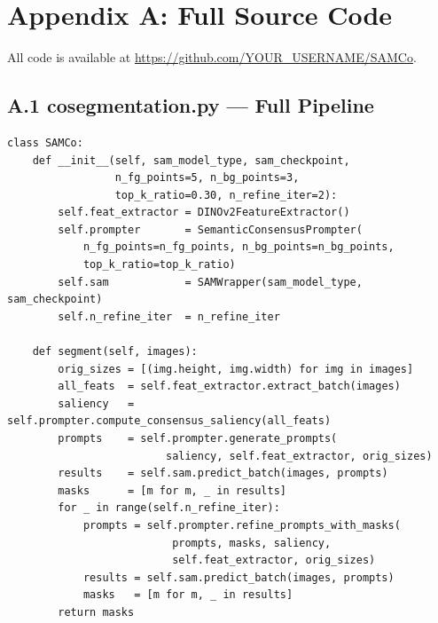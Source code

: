 \documentclass[10pt,twocolumn,letterpaper]{article}
\begin{document}
\newpage
\onecolumn
\appendix
\section*{Appendix A: Full Source Code}
\label{app:code}

All code is available at \url{https://github.com/YOUR_USERNAME/SAMCo}.

\subsection*{A.1 cosegmentation.py — Full Pipeline}
\begin{verbatim}
class SAMCo:
    def __init__(self, sam_model_type, sam_checkpoint,
                 n_fg_points=5, n_bg_points=3,
                 top_k_ratio=0.30, n_refine_iter=2):
        self.feat_extractor = DINOv2FeatureExtractor()
        self.prompter       = SemanticConsensusPrompter(
            n_fg_points=n_fg_points, n_bg_points=n_bg_points,
            top_k_ratio=top_k_ratio)
        self.sam            = SAMWrapper(sam_model_type, sam_checkpoint)
        self.n_refine_iter  = n_refine_iter

    def segment(self, images):
        orig_sizes = [(img.height, img.width) for img in images]
        all_feats  = self.feat_extractor.extract_batch(images)
        saliency   = self.prompter.compute_consensus_saliency(all_feats)
        prompts    = self.prompter.generate_prompts(
                         saliency, self.feat_extractor, orig_sizes)
        results    = self.sam.predict_batch(images, prompts)
        masks      = [m for m, _ in results]
        for _ in range(self.n_refine_iter):
            prompts = self.prompter.refine_prompts_with_masks(
                          prompts, masks, saliency,
                          self.feat_extractor, orig_sizes)
            results = self.sam.predict_batch(images, prompts)
            masks   = [m for m, _ in results]
        return masks
\end{verbatim}
\end{document}
